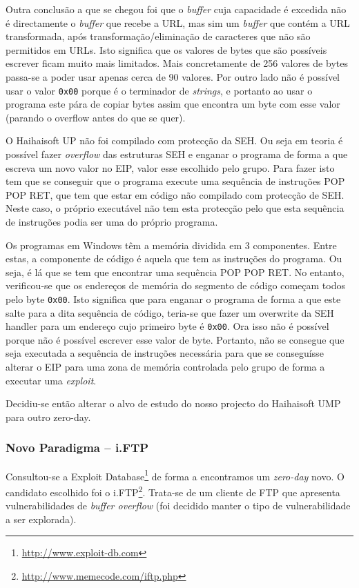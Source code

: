 \documentclass[a4paper]{article}
\begin{document}
Outra conclusão a que se chegou foi que o \textit{buffer} cuja capacidade é excedida não é directamente o \textit{buffer} que recebe a URL, mas sim um \textit{buffer} que contém a URL transformada, após transformação/eliminação de caracteres que não são permitidos em URLs. Isto significa que os valores de bytes que são possíveis escrever ficam muito mais limitados. Mais concretamente de 256 valores de bytes passa-se a poder usar apenas cerca de 90 valores. Por outro lado não é possível usar o valor \texttt{0x00} porque é o terminador de \textit{strings}, e portanto ao usar o programa este pára de copiar bytes assim que encontra um byte com esse valor (parando o overflow antes do que se quer).

O Haihaisoft UP não foi compilado com protecção da SEH. Ou seja em teoria é possível fazer \textit{overflow} das estruturas SEH e enganar o programa de forma a que escreva um novo valor no EIP, valor esse escolhido pelo grupo. Para fazer isto tem que se conseguir que o programa execute uma sequência de instruções POP POP RET, que tem que estar em código não compilado com protecção de SEH. Neste caso, o próprio executável não tem esta protecção pelo que esta sequência de instruções podia ser uma do próprio programa.

Os programas em Windows têm a memória dividida em 3 componentes. Entre estas, a componente de código é aquela que tem as instruções do programa. Ou seja, é lá que se tem que encontrar uma sequência POP POP RET. No entanto, verificou-se que os endereços de memória do segmento de código começam todos pelo byte \texttt{0x00}. Isto significa que para enganar o programa de forma a que este salte para a dita sequência de código, teria-se que fazer um overwrite da SEH handler para um endereço cujo primeiro byte é \texttt{0x00}. Ora isso não é possível porque não é possível escrever esse valor de byte. Portanto, não se consegue que seja executada a sequência de instruções necessária para que se conseguísse alterar o EIP para uma zona de memória controlada pelo grupo de forma a executar uma \textit{exploit}.

Decidiu-se então alterar o alvo de estudo do nosso projecto do Haihaisoft UMP para outro zero-day.


\subsubsection{Novo Paradigma -- i.FTP}
Consultou-se a Exploit Database\footnote{\url{http://www.exploit-db.com}} de forma a encontramos um \textit{zero-day} novo. O candidato escolhido foi o i.FTP\footnote{\url{http://www.memecode.com/iftp.php}}. Trata-se de um cliente de FTP que apresenta vulnerabilidades de \textit{buffer overflow} (foi decidido manter o tipo de vulnerabilidade a ser explorada).
\end{document}
